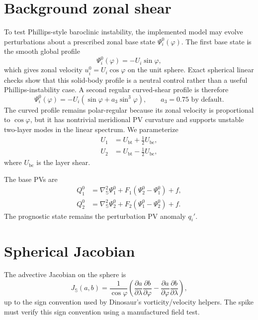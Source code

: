 \documentclass[11pt]{article}
\newcommand{\lapS}{\nabla_{\mathbb{S}}^{2}}
\newcommand{\jacS}{J_{\mathbb{S}}}
\begin{document}
\section{Background zonal shear}

To test Phillips-style baroclinic instability, the implemented model may
evolve perturbations about a prescribed zonal base state
$\Psi_i^0(\varphi)$.  The first base state is the smooth global profile
\begin{equation}
  \Psi_i^0(\varphi) = -U_i\sin\varphi,
\end{equation}
which gives zonal velocity $u_i^0 = U_i\cos\varphi$ on the unit sphere.
Exact spherical linear checks show that this solid-body profile is a neutral
control rather than a useful Phillips-instability case.  A second regular
curved-shear profile is therefore
\begin{equation}
  \Psi_i^0(\varphi)
  =
  -U_i\left(\sin\varphi + a_3\sin^3\varphi\right),
  \qquad a_3 = 0.75 \text{ by default}.
\end{equation}
The curved profile remains polar-regular because its zonal velocity is
proportional to $\cos\varphi$, but it has nontrivial meridional PV curvature
and supports unstable two-layer modes in the linear spectrum.
We parameterize
\begin{align}
  U_1 &= U_{\mathrm{bt}} + \frac{1}{2}U_{\mathrm{bc}},\\
  U_2 &= U_{\mathrm{bt}} - \frac{1}{2}U_{\mathrm{bc}},
\end{align}
where $U_{\mathrm{bc}}$ is the layer shear.

The base PVs are
\begin{align}
  Q_1^0 &= \lapS \Psi_1^0 + F_1(\Psi_2^0-\Psi_1^0) + f,\\
  Q_2^0 &= \lapS \Psi_2^0 + F_2(\Psi_1^0-\Psi_2^0) + f.
\end{align}
The prognostic state remains the perturbation PV anomaly $q_i'$.

\section{Spherical Jacobian}

The advective Jacobian on the sphere is
\begin{equation}
  \jacS(a,b)
  =
  \frac{1}{\cos\varphi}
  \left(
    \frac{\partial a}{\partial \lambda}
    \frac{\partial b}{\partial \varphi}
    -
    \frac{\partial a}{\partial \varphi}
    \frac{\partial b}{\partial \lambda}
  \right),
\end{equation}
up to the sign convention used by Dinosaur's vorticity/velocity helpers.
The spike must verify this sign convention using a manufactured field test.
\end{document}

